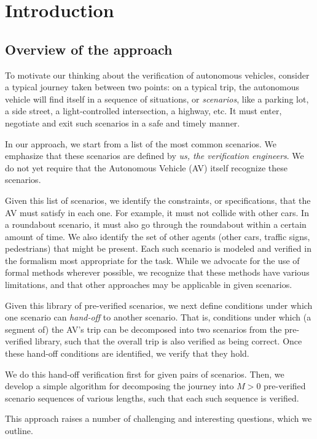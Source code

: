 \section{Introduction}
\label{introduction}

\subsection{Overview of the approach}
To motivate our thinking about the verification of autonomous vehicles, consider a typical journey taken between two points:
on a typical trip, the autonomous vehicle will find itself in a sequence of situations, or \emph{scenarios}, like a parking lot, a side street, a light-controlled intersection, a highway, etc.
It must enter, negotiate and exit such scenarios in a safe and timely manner.

In our approach, we start from a list of the most common scenarios. 
We emphasize that these scenarios are defined by \emph{us, the verification engineers}.
We do not yet require that the Autonomous Vehicle (AV) itself recognize these scenarios.

Given this list of scenarios, we identify the constraints, or specifications, that the AV must satisfy in each one.
For example, it must not collide with other cars. 
In a roundabout scenario, it must also go through the roundabout within a certain amount of time.
We also identify the set of other agents (other cars, traffic signs, pedestrians) that might be present.
Each such scenario is modeled and verified in the formalism most appropriate for the task. 
While we advocate for the use of formal methods wherever possible, we recognize that these methods have various limitations, and that other approaches may be applicable in given scenarios.

Given this library of pre-verified scenarios, we next define conditions under which one scenario can \emph{hand-off} to another scenario. 
That is, conditions under which (a segment of) the AV's trip can be decomposed into two scenarios from the pre-verified library, such that the overall trip is also verified as being correct.
Once these hand-off conditions are identified, we verify that they hold.

We do this hand-off verification first for given pairs of scenarios. 
Then, we develop a simple algorithm for decomposing the journey into $M>0$ pre-verified scenario sequences of various lengths, such that each such sequence is verified.

This approach raises a number of challenging and interesting questions, which we outline.

